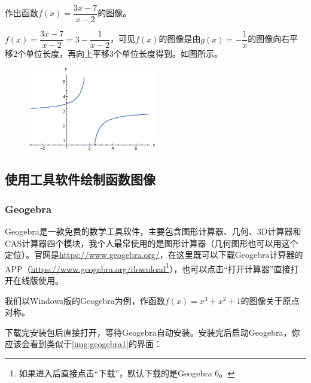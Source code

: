 \documentclass[lang=cn,math=cm,chinesefont=nofont,11pt,scheme=chinese,onecol]{elegantbook}
\begin{document}
\begin{example}
  作出函数$f(x)=\dfrac{3x-7}{x-2}$的图像。
\end{example}

\begin{spacing}{1.8}
  
\end{spacing}
\begin{solution}
  \begin{spacing}{1.8}
    $f(x)=\dfrac{3x-7}{x-2}=3-\dfrac{1}{x-2}$，可见$f(x)$的图像是由$g(x)=-\dfrac{1}{x}$的图像向右平移2个单位长度，再向上平移$3$个单位长度得到。如图所示。
  \end{spacing}
\end{solution}

\begin{figure}[h]
  \centering
  \includegraphics[width=0.5\textwidth]{image/2.1.5function4.eps}
  \label{img:2.1.5function4}
\end{figure}

\subsection{使用工具软件绘制函数图像}

\subsubsection{Geogebra}

Geogebra是一款免费的数学工具软件，主要包含图形计算器、几何、3D计算器和CAS计算器四个模块，我个人最常使用的是图形计算器（几何图形也可以用这个定位）。官网是\href{https://www.geogebra.org/}{https://www.geogebra.org/}，在这里既可以下载Geogebra计算器的APP（\href{https://www.geogebra.org/download}{https://www.geogebra.org/download}\footnote{如果进入后直接点击“下载”，默认下载的是Geogebra 6。}），也可以点击“打开计算器”直接打开在线版使用。

我们以Windows版的Geogebra为例，作函数$f(x)=x^3+x^2+1$的图像关于原点对称。

下载完安装包后直接打开，等待Geogebra自动安装。安装完后启动Geogebra，你应该会看到类似于\ref{img:geogebra1}的界面：
\end{document}
